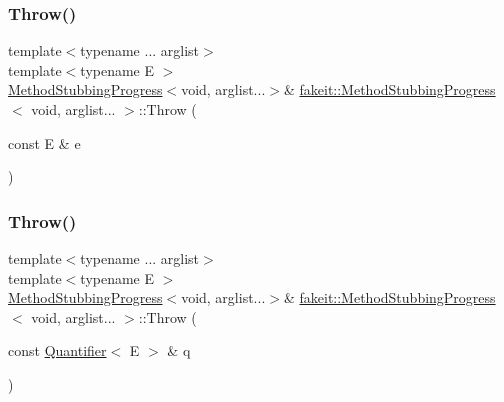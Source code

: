 \mbox{\label{structfakeit_1_1MethodStubbingProgress_3_01void_00_01arglist_8_8_8_01_4_a8b0d920dc6424eadd7dce7cb9df66814}} 
\subsubsection{\texorpdfstring{Throw()}{Throw()}\hspace{0.1cm}{\footnotesize\ttfamily [4/27]}}
{\footnotesize\ttfamily template$<$typename ... arglist$>$ \\
template$<$typename E $>$ \\
\mbox{\hyperlink{structfakeit_1_1MethodStubbingProgress}{Method\+Stubbing\+Progress}}$<$void, arglist...$>$\& \mbox{\hyperlink{structfakeit_1_1MethodStubbingProgress}{fakeit\+::\+Method\+Stubbing\+Progress}}$<$ void, arglist... $>$\+::Throw (\begin{DoxyParamCaption}\item[{const E \&}]{e }\end{DoxyParamCaption})\hspace{0.3cm}{\ttfamily [inline]}}

\mbox{\label{structfakeit_1_1MethodStubbingProgress_3_01void_00_01arglist_8_8_8_01_4_a9eb6f25dd382ef939b775345205f42c1}} 
\subsubsection{\texorpdfstring{Throw()}{Throw()}\hspace{0.1cm}{\footnotesize\ttfamily [5/27]}}
{\footnotesize\ttfamily template$<$typename ... arglist$>$ \\
template$<$typename E $>$ \\
\mbox{\hyperlink{structfakeit_1_1MethodStubbingProgress}{Method\+Stubbing\+Progress}}$<$void, arglist...$>$\& \mbox{\hyperlink{structfakeit_1_1MethodStubbingProgress}{fakeit\+::\+Method\+Stubbing\+Progress}}$<$ void, arglist... $>$\+::Throw (\begin{DoxyParamCaption}\item[{const \mbox{\hyperlink{structfakeit_1_1Quantifier}{Quantifier}}$<$ E $>$ \&}]{q }\end{DoxyParamCaption})\hspace{0.3cm}{\ttfamily [inline]}}

